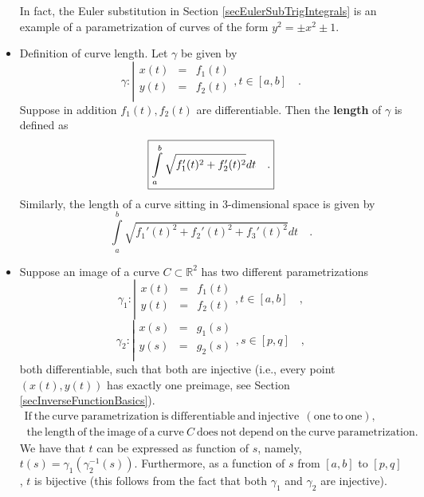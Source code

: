 \documentclass[12pt]{book}
\newcommand{\importantFormula}[1]{\begin{equation} \boxed{#1} \end{equation}}
\renewcommand{\emph}{\textbf}
\begin{document}
\begin{itemize}
In fact, the Euler substitution in Section \ref{secEulerSubTrigIntegrals} is an example of a parametrization of curves of the form $y^2=\pm x^2\pm 1$.
\item {}Definition of curve length. Let $\gamma$ be given by
\[
\gamma:\left| 
\begin{array}{rcl}
x(t)&=&f_1(t)\\
y(t)&=&f_2(t)\\
\end{array}\right., t\in [a,b]\quad .
\]
Suppose in addition $f_1(t), f_2(t)$ are differentiable. Then the \emph{length} of $\gamma$ is defined as 
\importantFormula{
\label{eqDefLengthCurve}
\int\limits_{a}^b \sqrt{f_1'(t)^2+f_2'(t)^2}dt \quad . 
}
Similarly, the length of a curve sitting in 3-dimensional space is given by 
\[
\int\limits_{a}^b \sqrt{f_1'(t)^2+f_2'(t)^2+f_3'(t)^2}dt \quad . 
\] 
\item Suppose an image of a curve $C\subset \mathbb R^2$ has two different parametrizations 
\begin{equation}\label{eqDefCurve1}
\gamma_1:\left| 
\begin{array}{rcl}
x(t)&=&f_1(t)\\
y(t)&=&f_2(t)\\
\end{array}\right., t\in [a,b]\quad ,
\end{equation}
\begin{equation}\label{eqDefCurve2}
\gamma_2:\left| 
\begin{array}{rcl}
x(s)&=&g_1(s)\\
y(s)&=&g_2(s)\\
\end{array}\right. , s\in [p,q]\quad ,
\end{equation}
both differentiable, such that both are injective (i.e., every point $(x(t), y(t))$ has exactly one preimage, see Section \ref{secInverseFunctionBasics}). 
\importantFormula{
\begin{array}{c}
\mathrm{If~the~curve~parametrization~is~differentiable~and~injective~~(one~to~one),}\\
\mathrm{~the~length~of~the~image~of~a~curve~}C
\mathrm{~does~not~depend~on~the~curve~parametrization.}
\end{array}
}
We have that $t$ can be expressed as function of $s$, namely, $t(s)= \gamma_1(\gamma_2^{-1}(s))$. Furthermore, as a function of $s$ from $[a,b]$ to $[p,q]$, $t$ is bijective (this follows from the fact that both $\gamma_1$ and $\gamma_2$ are injective).


\end{itemize}
\end{document}
